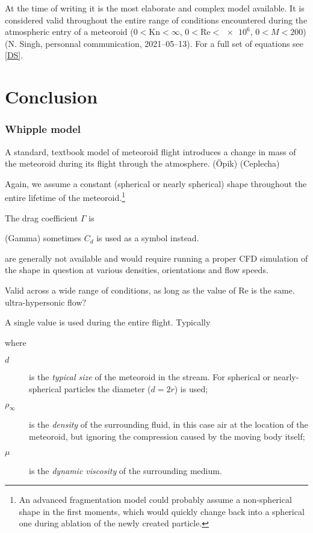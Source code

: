             At the time of writing it is the most elaborate and complex model available.
            It is considered valid throughout the entire range of
            conditions encountered during the atmospheric entry of a meteoroid
            ($0 < \mathrm{Kn} < \infty$, $0 < \mathrm{Re} < \num{e6}$, $0 < M < 200$)
            (N. Singh, personnal communication, 2021--05--13).
            For a full set of equations see \cref{DS}.

\section{Conclusion} \label{dc}

    \subsubsection{Whipple model} \label{mmw}
        A standard, textbook model of meteoroid flight introduces a change in mass of the meteoroid
        during its flight through the atmosphere.
        (Öpik) (Ceplecha)

        Again, we assume a constant (spherical or nearly spherical) shape throughout the entire
        lifetime of the meteoroid.\footnote{An advanced fragmentation model could probably assume a non-spherical
        shape in the first moments, which would quickly change back into a spherical one during ablation
        of the newly created particle.}

        The drag coefficient $\Gamma$ is 

        (Gamma) sometimes $C_d$ is used as a symbol instead.

        are generally not available and would require running a proper CFD simulation
        of the shape in question at various densities, orientations and flow speeds.

        Valid across a wide range of conditions, as long as the value of Re is the same.
        ultra-hypersonic flow?

        A single value is used during the entire flight. Typically


        where
        \begin{description}
            \item[$d$] is the \emph{typical size} of the meteoroid in the stream.
                For spherical or nearly-spherical particles the diameter ($d = 2r$) is used;
            \item[$\rho_\infty$] is the \emph{density} of the surrounding fluid, in this case
                air at the location of the meteoroid, but ignoring the compression caused
                by the moving body itself;
            \item[$\mu$] is the \emph{dynamic viscosity} of the surrounding medium.
        \end{description}

